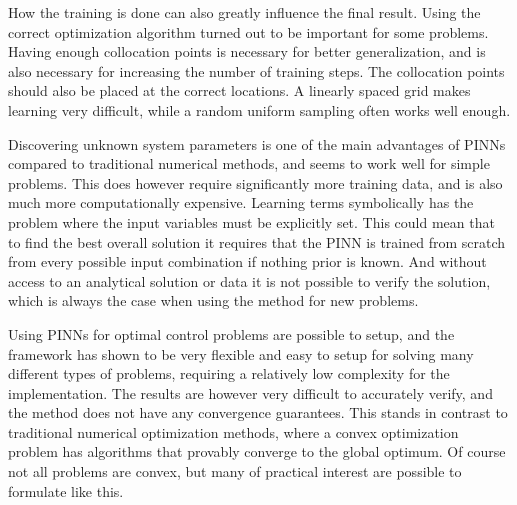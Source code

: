 How the training is done can also greatly influence the final result. Using the correct optimization algorithm turned out to be important for some problems. Having enough collocation points is necessary for better generalization, and is also necessary for increasing the number of training steps. The collocation points should also be placed at the correct locations. A linearly spaced grid makes learning very difficult, while a random uniform sampling often works well enough. 

Discovering unknown system parameters is one of the main advantages of PINNs compared to traditional numerical methods, and seems to work well for simple problems. This does however require significantly more training data, and is also much more computationally expensive. Learning terms symbolically has the problem where the input variables must be explicitly set. This could mean that to find the best overall solution it requires that the PINN is trained from scratch from every possible input combination if nothing prior is known. And without access to an analytical solution or data it is not possible to verify the solution, which is always the case when using the method for new problems.

Using PINNs for optimal control problems are possible to setup, and the framework has shown to be very flexible and easy to setup for solving many different types of problems, requiring a relatively low complexity for the implementation. The results are however very difficult to accurately verify, and the method does not have any convergence guarantees. This stands in contrast to traditional numerical optimization methods, where a convex optimization problem has algorithms that provably converge to the global optimum. Of course not all problems are convex, but many of practical interest are possible to formulate like this.